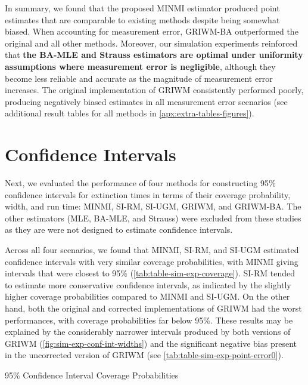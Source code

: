 In summary, we found that the proposed MINMI estimator produced point estimates that are comparable to existing methods despite being somewhat biased. When accounting for measurement error, GRIWM-BA outperformed the original and all other methods. Moreover, our simulation experiments reinforced that \textbf{the BA-MLE and Strauss estimators are optimal under uniformity assumptions where measurement error is negligible}, although they become less reliable and accurate as the magnitude of measurement error increases. The original implementation of GRIWM consistently performed poorly, producing negatively biased estimates in all measurement error scenarios (see additional result tables for all methods in \autoref{apx:extra-tables-figures}).

\section{Confidence Intervals}

Next, we evaluated the performance of four methods for constructing 95\% confidence intervals for extinction times in terms of their coverage probability, width, and run time: MINMI, SI-RM, SI-UGM, GRIWM, and GRIWM-BA. The other estimators (MLE, BA-MLE, and Strauss) were excluded from these studies as they are were not designed to estimate confidence intervals.

Across all four scenarios, we found that MINMI, SI-RM, and SI-UGM estimated confidence intervals with very similar coverage probabilities, with MINMI giving intervals that were closest to 95\% (\autoref{tab:table-sim-exp-coverage}). SI-RM tended to estimate more conservative confidence intervals, as indicated by the slightly higher coverage probabilities compared to MINMI and SI-UGM. On the other hand, both the original and corrected implementations of GRIWM had the worst performances, with coverage probabilities far below 95\%. These results may be explained by the considerably narrower intervals produced by both versions of GRIWM (\autoref{fig:sim-exp-conf-int-widths}) and the significant negative bias present in the uncorrected version of GRIWM (see \autoref{tab:table-sim-exp-point-error0}).
\begin{table}[ht]
    \centering
    \caption{95\% Confidence Interval Coverage Probabilities}
    
    \label{tab:table-sim-exp-coverage}
    \vspace{-4mm}
\end{table}

